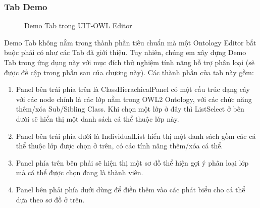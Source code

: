 \subsubsection{Tab Demo}
\begin{figure}[h!]
	\centering
	\caption{Demo Tab trong UIT-OWL Editor\label{overflow}}
\end{figure}
Demo Tab không nằm trong thành phần tiêu chuẩn mà một Ontology Editor bắt buộc phải có như các Tab đã giới thiệu. Tuy nhiên, chúng em xây dựng Demo Tab trong ứng dụng này với mục đích thử nghiệm tính năng hỗ trợ phân loại (sẽ được đề cập trong phần sau của chương này). Các thành phần của tab này gồm:
\begin{enumerate}
\item Panel bên trái phía trên là ClassHierachicalPanel có một cấu trúc dạng cây với các node chính là các lớp nằm trong OWL2 Ontology, với các chức năng thêm/xóa Sub/Sibling Class. Khi chọn một lớp ở đây thì ListSelect ở bên dưới sẽ hiển thị một danh sách cá thể thuộc lớp này.
\item Panel bên trái phía dưới là IndividualList hiển thị một danh sách gồm các cá thể thuộc lớp được chọn ở trên, có các tính năng thêm/xóa cá thể.
\item Panel phía trên bên phải sẽ hiện thị một sơ đồ thể hiện gợi ý phân loại lớp mà cá thể được chọn đang là thành viên.
\item Panel bên phải phía dưới dùng để điền thêm vào các phát biểu cho cá thể dựa theo sơ đồ ở trên.
\end{enumerate}


